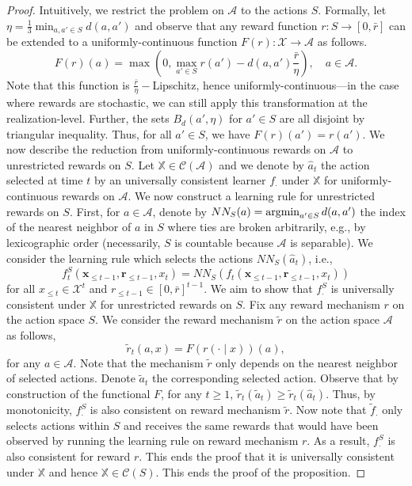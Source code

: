 \documentclass[aos]{imsart}
\theoremstyle{plain}
\theoremstyle{remark}
\newcommand{\Acal}{\mathcal{A}}
\newcommand{\Ccal}{\mathcal{C}}
\newcommand{\Xcal}{\mathcal{X}}
\newcommand{\Xbb}{\mathbb{X}}
\newcommand{\1}{\mathbbm{1}}%
\newcommand{\mb}[1]{\ensuremath{\boldsymbol{#1}}}
\newcommand{\argmin}{\mathop{\rm argmin}}
\begin{document}
\begin{proof}
Intuitively, we restrict the problem on $\Acal$ to the actions $S$. Formally, let $\eta = \frac{1}{3}\min_{a,a'\in S}d(a,a')$ and observe that any reward function $r:S\to [0,\bar r]$ can be extended to a  uniformly-continuous function $F(r):\Xcal\to\Acal$ as follows.
\begin{equation*}
    F(r)(a) = \max\left(0,\max_{a'\in S}r(a')-d(a,a') \frac{\bar r}{\eta}\right),\quad a \in \Acal.
\end{equation*}
Note that this function is $\frac{\bar r}{\eta}-$Lipschitz, hence  uniformly-continuous---in the case where rewards are stochastic, we can still apply this transformation at the realization-level. Further, the sets $B_d(a',\eta)$ for $a'\in S$ are all disjoint by triangular inequality. Thus, for all $a'\in S$, we have $F(r)(a')=r(a')$. We now describe the reduction from uniformly-continuous rewards on $\Acal$ to unrestricted rewards on $S$. Let $\Xbb\in\Ccal(\Acal)$ and we denote by $\hat a_t$ the action selected at time $t$ by an universally consistent learner $f_\cdot$ under $\Xbb$ for uniformly-continuous rewards on $\Acal$. We now construct a learning rule for unrestricted rewards on $S$. First, for $a\in\Acal$, denote by $NN_S(a) =\argmin_{a'\in S} d(a,a')$ the index of the nearest neighbor of $a$ in $S$ where ties are broken arbitrarily, e.g., by lexicographic order (necessarily, $S$ is countable because $\Acal$ is separable). We consider the learning rule which selects the actions $NN_S(\hat a_t)$, i.e.,
\begin{equation*}
    f_t^{S}(\mb x_{\leq t-1},\mb r_{\leq t-1},x_t) = NN_S(f_t(\mb x_{\leq t-1},\mb r_{\leq t-1},x_t))
\end{equation*}
for all $x_{\leq t}\in\Xcal^t$ and $r_{\leq t-1}\in [0,\bar r]^{t-1}$. We aim to show that $f^S_\cdot$ is universally consistent under $\Xbb$ for unrestricted rewards on $S$. Fix any reward mechanism $r$ on the action space $S$. We consider the reward mechanism $\tilde r$ on the action space $\Acal$ as follows,
\begin{equation*}
    \tilde r_t(a, x) = F(r(\cdot\mid x))(a),
\end{equation*}
for any $a\in \Acal$. Note that the mechanism $\tilde r$ only depends on the nearest neighbor of selected actions. Denote $\tilde a_t$ the corresponding selected action. Observe that by construction of the functional $F$, for any $t\geq 1$, $\tilde r_t(\tilde a_t)\geq \tilde r_t(\hat a_t)$. Thus, by monotonicity, $f_\cdot^S$ is also consistent on reward mechanism $\tilde r$. Now note that $\tilde f_\cdot$ only selects actions within $S$ and receives the same rewards that would have been observed by running the learning rule on reward mechanism $r$. As a result, $f^{S}_\cdot$ is also consistent for reward $r$. This ends the proof that it is universally consistent under $\Xbb$ and hence $\Xbb\in\Ccal(S)$. This ends the proof of the proposition.


\end{proof}
\end{document}

